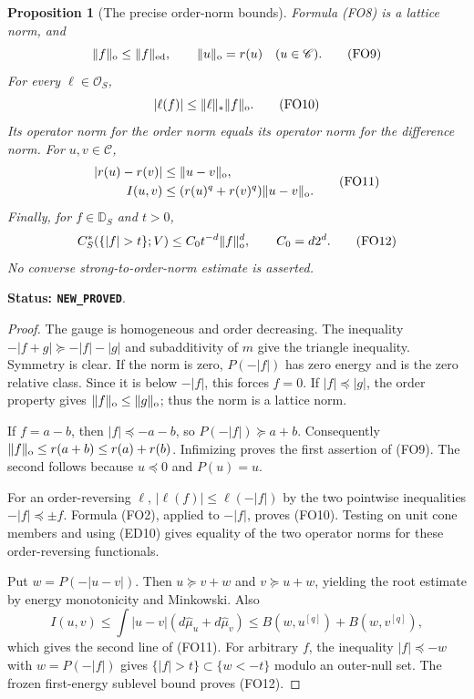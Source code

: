 \documentclass[11pt,a4paper]{article}
\numberwithin{equation}{section}
\newtheorem{proposition}[theorem]{Proposition}
\theoremstyle{definition}
\theoremstyle{remark}
\begin{document}
\begin{proposition}[The precise order-norm bounds]
\label{prop:r12-order-energy-norm}
Formula \textup{(FO8)} is a lattice norm, and
\[
 \|f\|_{\rm o}\le\|f\|_{\rm ed},\qquad
 \|u\|_{\rm o}=r(u)\quad(u\in\mathscr C).
 \tag{FO9}
\]
For every $\ell\in\mathscr O_S$,
\[
                |\ell(f)|\le\|\ell\|_*\|f\|_{\rm o}.
 \tag{FO10}
\]
Its operator norm for the order norm equals its operator
norm for the difference norm.  For $u,v\in\mathscr C$,
\[
 \begin{split}
 |r(u)-r(v)|&\le\|u-v\|_{\rm o},\\
 I(u,v)&\le(r(u)^q+r(v)^q)\|u-v\|_{\rm o}.
 \end{split}
 \tag{FO11}
\]
Finally, for $f\in\mathbb D_S$ and $t>0$,
\[
 C_S^*(\{|f|>t\};V)
                  \le C_0t^{-d}\|f\|_{\rm o}^d,
                         \qquad C_0=d2^d.
 \tag{FO12}
\]
No converse strong-to-order-norm estimate is asserted.
\end{proposition}

\noindent\textbf{Status: \texttt{NEW\_PROVED}}.

\begin{proof}
The gauge is homogeneous and order decreasing.  The
inequality $-|f+g|\succeq-|f|-|g|$ and subadditivity
of $m$ give the triangle inequality.  Symmetry is clear.
If the norm is zero, $P(-|f|)$ has zero energy and is
the zero relative class.  Since it is below $-|f|$,
this forces $f=0$.  If $|f|\preceq|g|$, the order
property gives $\|f\|_{\rm o}\le\|g\|_{\rm o}$;
thus the norm is a lattice norm.

If $f=a-b$, then $|f|\preceq-a-b$, so
$P(-|f|)\succeq a+b$.  Consequently
$\|f\|_{\rm o}\le r(a+b)\le r(a)+r(b)$.
Infimizing proves the first assertion of \textup{(FO9)}.
The second follows because $u\preceq0$ and $P(u)=u$.

For an order-reversing $\ell$,
$|\ell(f)|\le\ell(-|f|)$ by the two pointwise
inequalities $-|f|\preceq\pm f$.  Formula
\textup{(FO2)}, applied to $-|f|$, proves
\textup{(FO10)}.  Testing on unit cone members and
using \textup{(ED10)} gives equality of the two
operator norms for these order-reversing functionals.

Put $w=P(-|u-v|)$.  Then $u\succeq v+w$ and
$v\succeq u+w$, yielding the root estimate by
energy monotonicity and Minkowski.  Also
\[
 I(u,v)\le\int|u-v|(d\widehat\mu_u+d\widehat\mu_v)
       \le B(w,u^{[q]})+B(w,v^{[q]}),
\]
which gives the second line of \textup{(FO11)}.
For arbitrary $f$, the inequality $|f|\preceq-w$
with $w=P(-|f|)$ gives
$\{|f|>t\}\subset\{w<-t\}$ modulo an outer-null
set.  The frozen first-energy sublevel bound proves
\textup{(FO12)}.
\end{proof}
\end{document}
